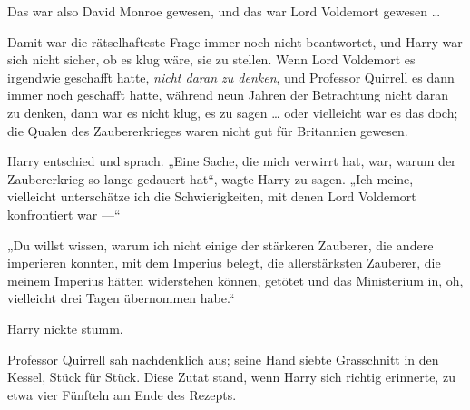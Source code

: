 Das war also David Monroe gewesen, und das war Lord Voldemort gewesen …

Damit war die rätselhafteste Frage immer noch nicht beantwortet, und Harry war sich nicht sicher, ob es klug wäre, sie zu stellen. Wenn Lord Voldemort es irgendwie geschafft hatte, \emph{nicht daran zu denken}, und Professor Quirrell es dann immer noch geschafft hatte, während neun Jahren der Betrachtung nicht daran zu denken, dann war es nicht klug, es zu sagen … oder vielleicht war es das doch; die Qualen des Zaubererkrieges waren nicht gut für Britannien gewesen.

Harry entschied und sprach.
„Eine Sache, die mich verwirrt hat, war, warum der Zaubererkrieg so lange gedauert hat“, wagte Harry zu sagen.
„Ich meine, vielleicht unterschätze ich die Schwierigkeiten, mit denen Lord Voldemort konfrontiert war —“

„Du willst wissen, warum ich nicht einige der stärkeren Zauberer, die andere imperieren konnten, mit dem Imperius belegt, die allerstärksten Zauberer, die meinem Imperius hätten widerstehen können, getötet und das Ministerium in, oh, vielleicht drei Tagen übernommen habe.“

Harry nickte stumm.

Professor Quirrell sah nachdenklich aus; seine Hand siebte Grasschnitt in den Kessel, Stück für Stück. Diese Zutat stand, wenn Harry sich richtig erinnerte, zu etwa vier Fünfteln am Ende des Rezepts.

